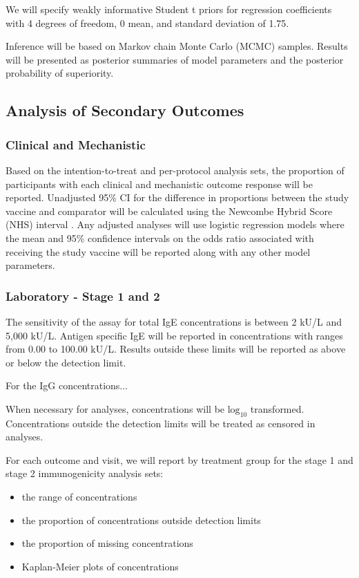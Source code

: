 \documentclass{bmcart}
\begin{document}
We will specify weakly informative Student t priors for regression coefficients with 4 degrees of freedom, 0 mean, and standard deviation of 1.75.

Inference will be based on Markov chain Monte Carlo (MCMC) samples.
Results will be presented as posterior summaries of model parameters and the posterior probability of superiority.

\subsection*{Analysis of Secondary Outcomes}

\subsubsection*{Clinical and Mechanistic}

Based on the intention-to-treat and per-protocol analysis sets, the proportion of participants with each clinical and mechanistic outcome response will be reported.
Unadjusted 95\% CI for the difference in proportions between the study vaccine and comparator will be calculated using the Newcombe Hybrid Score (NHS) interval \cite{newcombe1998interval}.
Any adjusted analyses will use logistic regression models where the mean and 95\% confidence intervals on the odds ratio associated with receiving the study vaccine will be reported along with any other model parameters.

\subsubsection*{Laboratory - Stage 1 and 2}

The sensitivity of the assay for total IgE concentrations is between 2 kU/L and 5,000 kU/L.
Antigen specific IgE will be reported in concentrations with ranges from 0.00 to 100.00 kU/L.
Results outside these limits will be reported as above or below the detection limit.

For the IgG concentrations...

When necessary for analyses, concentrations will be $\text{log}_{10}$ transformed.
Concentrations outside the detection limits will be treated as censored in analyses.

For each outcome and visit, we will report by treatment group for the stage 1 and stage 2 immunogenicity analysis sets:
\begin{itemize}
	\item the range of concentrations
	\item the proportion of concentrations outside detection limits
	\item the proportion of missing concentrations
	\item Kaplan-Meier plots of concentrations
\end{itemize}
\end{document}
